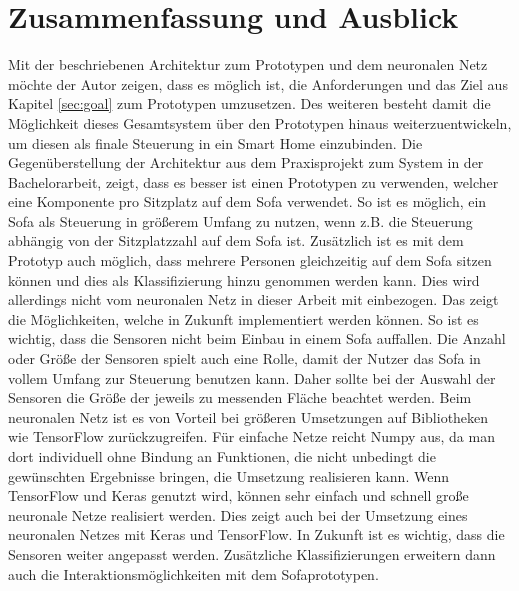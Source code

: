 \section{Zusammenfassung und Ausblick}
Mit der beschriebenen Architektur zum Prototypen und dem neuronalen Netz möchte der Autor zeigen, dass es möglich ist, die Anforderungen und das Ziel aus Kapitel \ref{sec:goal} zum Prototypen umzusetzen. Des weiteren besteht damit die Möglichkeit dieses Gesamtsystem über den Prototypen hinaus weiterzuentwickeln, um diesen als finale Steuerung in ein Smart Home einzubinden. 
\newline
Die Gegenüberstellung der Architektur aus dem Praxisprojekt zum System in der Bachelorarbeit, zeigt, dass es besser ist einen Prototypen zu verwenden, welcher eine Komponente pro Sitzplatz auf dem Sofa verwendet. So ist es möglich, ein Sofa als Steuerung in größerem Umfang zu nutzen, wenn z.B. die Steuerung abhängig von der Sitzplatzzahl auf dem Sofa ist. Zusätzlich ist es mit dem Prototyp auch möglich, dass mehrere Personen gleichzeitig auf dem Sofa sitzen können und dies als Klassifizierung hinzu genommen werden kann. Dies wird allerdings nicht vom neuronalen Netz in dieser Arbeit mit einbezogen. Das zeigt die Möglichkeiten, welche in Zukunft implementiert werden können. So ist es wichtig, dass die Sensoren nicht beim Einbau in einem Sofa auffallen. Die Anzahl oder Größe der Sensoren spielt auch eine Rolle, damit der Nutzer das Sofa in vollem Umfang zur Steuerung benutzen kann. Daher sollte bei der Auswahl der Sensoren die Größe der jeweils zu messenden Fläche beachtet werden.
\newline
Beim neuronalen Netz ist es von Vorteil bei größeren Umsetzungen auf Bibliotheken wie TensorFlow zurückzugreifen. Für einfache Netze reicht Numpy aus, da man dort individuell ohne Bindung an Funktionen, die nicht unbedingt die gewünschten Ergebnisse bringen, die Umsetzung realisieren kann.
\newline
Wenn TensorFlow und Keras genutzt wird, können sehr einfach und schnell große neuronale Netze realisiert werden. Dies zeigt auch \citep{frochte2018} bei der Umsetzung eines neuronalen Netzes mit Keras und TensorFlow. In Zukunft ist es wichtig, dass die Sensoren weiter angepasst werden. Zusätzliche Klassifizierungen erweitern dann auch die Interaktionsmöglichkeiten mit dem Sofaprototypen.